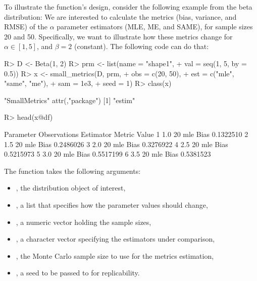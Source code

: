 \documentclass[nojss]{jss}
\newcommand{\fct}[1]{\code{#1()}}
\begin{document}
To illustrate the function's design, consider the following example from the beta distribution: We are interested to calculate the metrics (bias, variance, and RMSE) of the $\alpha$ parameter estimators (MLE, ME, and SAME), for sample sizes 20 and 50. Specifically, we want to illustrate how these metrics change for $\alpha\in[1,5]$, and $\beta=2$ (constant). The following code can do that:

\begin{Schunk}
\begin{Sinput}
R> D <- Beta(1, 2)
R> prm <- list(name = "shape1",
+              val = seq(1, 5, by = 0.5))
R> x <- small_metrics(D, prm,
+               obs = c(20, 50),
+               est = c("mle", "same", "me"),
+               sam = 1e3,
+               seed = 1)
R> class(x)
\end{Sinput}
\begin{Soutput}
[1] "SmallMetrics"
attr(,"package")
[1] "estim"
\end{Soutput}
\begin{Sinput}
R> head(x@df)
\end{Sinput}
\begin{Soutput}
  Parameter Observations Estimator Metric     Value
1       1.0           20       mle   Bias 0.1322510
2       1.5           20       mle   Bias 0.2486026
3       2.0           20       mle   Bias 0.3276922
4       2.5           20       mle   Bias 0.5215973
5       3.0           20       mle   Bias 0.5517199
6       3.5           20       mle   Bias 0.5381523
\end{Soutput}
\end{Schunk}

The \fct{small\_metrics} function takes the following arguments:
\begin{itemize}
\item {}, the distribution object of interest,
\item {}, a list that specifies how the  parameter values should change,
\item {}, a numeric vector holding the sample sizes,
\item {}, a character vector specifying the estimators under comparison,
\item {}, the Monte Carlo sample size to use for the metrics estimation,
\item {}, a seed to be passed to \fct{set.seed} for replicability.
\end{itemize}
\end{document}
